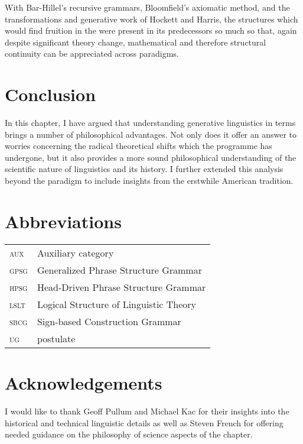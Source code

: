 \documentclass[output=paper]{langscibook}
\begin{document}
With Bar-Hillel's recursive grammars, Bloomfield's axiomatic method, and the transformations and generative work of Hockett and Harris, the structures which would find fruition in the  were present in its predecessors so much so that, again despite significant theory change, mathematical and therefore structural continuity can be appreciated across paradigms. 

\section{Conclusion}
\label{sec:nefdt:conc}

In this chapter, I have argued that understanding generative linguistics in  terms brings a number of philosophical advantages. Not only does it offer an answer to worries concerning the radical theoretical shifts which the programme has undergone, but it also provides a more sound philosophical understanding of the scientific nature of linguistics and its history. I further extended this analysis beyond the paradigm to include insights from the erstwhile American  tradition. 

\section*{Abbreviations}
\label{sec:nefdt:abbr}

\begin{tabularx}{.8\textwidth}{lQ}
\textsc{aux} & Auxiliary category\\
\textsc{gpsg} & Generalized Phrase Structure Grammar\\
\textsc{hpsg} & Head-Driven Phrase Structure Grammar\\ 
\textsc{lslt} & Logical Structure of Linguistic Theory
\\\textsc{sbcg} & Sign-based Construction Grammar
\\\textsc{ug} &  postulate
\end{tabularx}

\section*{Acknowledgements}
\label{sec:nefdt:ackn}

 I would like to thank Geoff Pullum and Michael Kac for their insights into the historical and technical linguistic details as well as Steven French for offering needed guidance on the philosophy of science aspects of the chapter.


{\sloppy
\printbibliography[heading=subbibliography,notkeyword=this]
  
}
\end{document}
